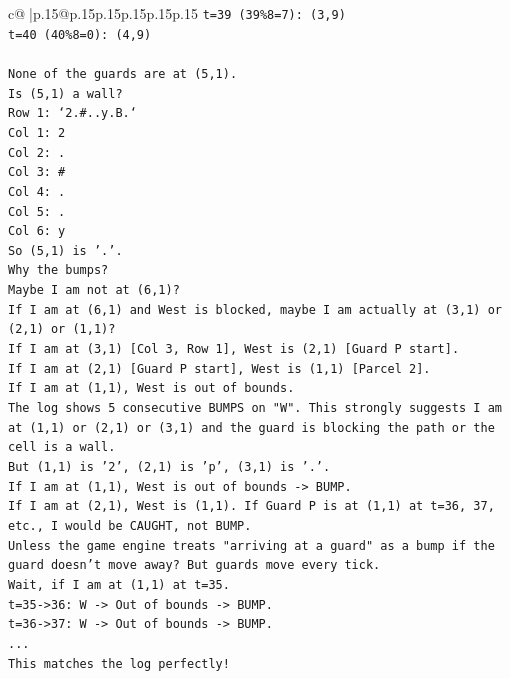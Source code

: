 \documentclass{article}
\begin{document}
{\begin{supertabular}{c@{$\;$}|p{.15\linewidth}@{}p{.15\linewidth}p{.15\linewidth}p{.15\linewidth}p{.15\linewidth}p{.15\linewidth}}
{{{\texttt{t=39 (39\%8=7): (3,9)} \\
\texttt{t=40 (40\%8=0): (4,9)} \\
\\ 
\texttt{None of the guards are at (5,1).} \\
\texttt{Is (5,1) a wall?} \\
\texttt{Row 1: `2.\#..y.B.`} \\
\texttt{Col 1: 2} \\
\texttt{Col 2: .} \\
\texttt{Col 3: \#} \\
\texttt{Col 4: .} \\
\texttt{Col 5: .} \\
\texttt{Col 6: y} \\
\texttt{So (5,1) is '.'.} \\
\texttt{Why the bumps?} \\
\texttt{Maybe I am not at (6,1)?} \\
\texttt{If I am at (6,1) and West is blocked, maybe I am actually at (3,1) or (2,1) or (1,1)?} \\
\texttt{If I am at (3,1) {[}Col 3, Row 1{]}, West is (2,1) {[}Guard P start{]}.} \\
\texttt{If I am at (2,1) {[}Guard P start{]}, West is (1,1) {[}Parcel 2{]}.} \\
\texttt{If I am at (1,1), West is out of bounds.} \\
\texttt{The log shows 5 consecutive BUMPS on "W". This strongly suggests I am at (1,1) or (2,1) or (3,1) and the guard is blocking the path or the cell is a wall.} \\
\texttt{But (1,1) is '2', (2,1) is 'p', (3,1) is '.'.} \\
\texttt{If I am at (1,1), West is out of bounds {-}> BUMP.} \\
\texttt{If I am at (2,1), West is (1,1). If Guard P is at (1,1) at t=36, 37, etc., I would be CAUGHT, not BUMP.} \\
\texttt{Unless the game engine treats "arriving at a guard" as a bump if the guard doesn't move away? But guards move every tick.} \\
\texttt{Wait, if I am at (1,1) at t=35.} \\
\texttt{t=35{-}>36: W {-}> Out of bounds {-}> BUMP.} \\
\texttt{t=36{-}>37: W {-}> Out of bounds {-}> BUMP.} \\
\texttt{...} \\
\texttt{This matches the log perfectly!} \\
}}}
\end{supertabular}}
\end{document}
